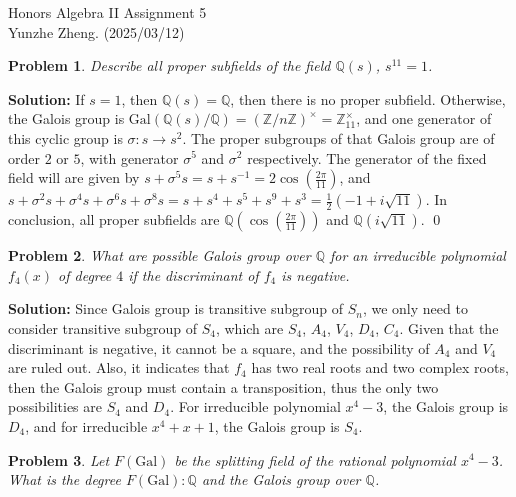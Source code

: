 \documentclass[12pt]{article}
\newtheorem{problem}{Problem}
\begin{document}
\noindent Honors Algebra II \hfill Assignment 5\\
Yunzhe Zheng. (2025/03/12)

\hrulefill

\begin{problem}
Describe all proper subfields of the field $\mathbb{Q}(s)$, $s^{11}=1$.
\end{problem}

\textbf{Solution:} If $s=1$, then $\mathbb{Q}(s)=\mathbb{Q}$, then there is no proper subfield. Otherwise, the Galois group is $\text{Gal}(\mathbb{Q}(s)/\mathbb{Q})=(\mathbb{Z}/n\mathbb{Z})^{\times}=\mathbb{Z}_{11}^\times$, and one generator of this cyclic group is $\sigma: s\to s^2$. The proper subgroups of that Galois group are of order $2$ or $5$, with generator $\sigma^{5}$ and $\sigma^{2}$ respectively. The generator of the fixed field will are given by $s+\sigma^{5}s=s+s^{-1}=2\cos(\frac{2\pi}{11})$, and $s+\sigma^{2}s+\sigma^{4}s+\sigma^{6}s+\sigma^{8}s=s+s^4+s^5+s^9+s^3=\frac{1}{2}(-1+i\sqrt{11})$. In conclusion, all proper subfields are $\mathbb{Q}(\cos(\frac{2\pi}{11}))$ and $\mathbb{Q}(i\sqrt{11})$. \qed
\\
\begin{problem}
What are possible Galois group over $\mathbb{Q}$ for an irreducible polynomial $f_{4}(x)$ of degree $4$ if the discriminant of $f_{4}$ is negative.
\end{problem}

\textbf{Solution:} Since Galois group is transitive subgroup of $S_{n}$, we only need to consider transitive subgroup of $S_{4}$, which are $S_{4}$, $A_{4}$, $V_{4}$, $D_{4}$, $C_{4}$. Given that the discriminant is negative, it cannot be a square, and the possibility of $A_{4}$ and $V_{4}$ are ruled out. Also, it indicates that $f_{4}$ has two real roots and two complex roots, then the Galois group must contain a transposition, thus the only two possibilities are $S_{4}$ and $D_{4}$. For irreducible polynomial $x^4-3$, the Galois group is $D_4$, and for irreducible $x^4+x+1$, the Galois group is $S_{4}$.
\\
\begin{problem}
Let $F(\text{Gal})$ be the splitting field of the rational polynomial $x^4-3$. What is the degree $F(\text{Gal}): \mathbb{Q}$ and the Galois group over $\mathbb{Q}$. 
\end{problem}
\end{document}
